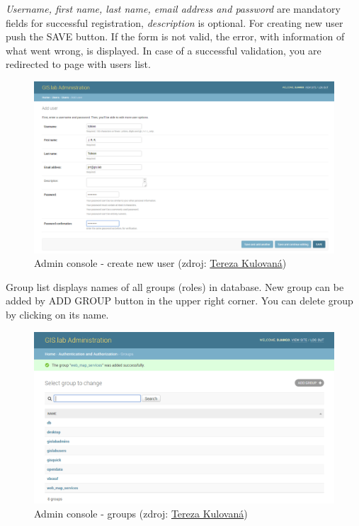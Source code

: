\textit{Username, first name, last name, email address and password}
are mandatory fields for successful registration, \textit{description}
is optional. For creating new user push the \textsf{SAVE} button. If
the form is not valid, the error, with information of what went wrong,
is displayed. In case of a successful validation, you are redirected
to page with users list.
\begin{figure}[H] \centering
    \includegraphics[width=430pt]{./prilohy/guide-admin-user-add.png}
    \caption[Admin console - create new user]{Admin console - create new user (zdroj:
	\href{}{Tereza Kulovaná})}
	\label{fig:guide-admin-user-add}
\end{figure}

Group list displays names of all groups (roles) in database. New group
can be added by \textsf{ADD GROUP} button in the upper right
corner. You can delete group by clicking on its name.
\begin{figure}[H] \centering
    \includegraphics[width=430pt]{./prilohy/guide-admin-groups.png}
    \caption[Admin console - groups]{Admin console - groups (zdroj:
	\href{}{Tereza Kulovaná})}
	\label{fig:guide-admin-groups}
\end{figure}


